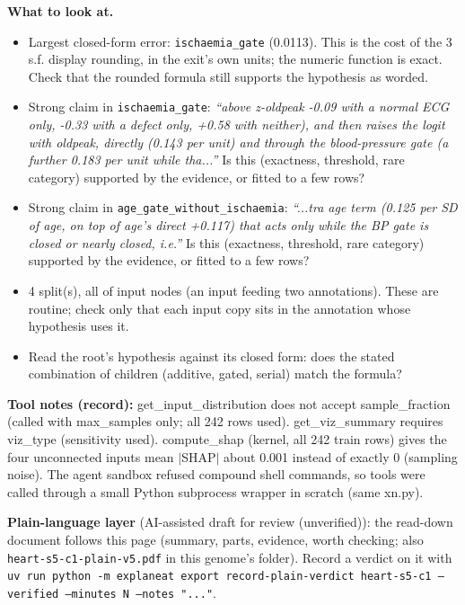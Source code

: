 \documentclass[a4paper,11pt]{article}
\begin{document}
\textbf{What to look at.}
\begin{itemize}
\item Largest closed-form error: \texttt{ischaemia\_\allowbreak{}gate} (0.0113). This is the cost of the 3 s.f. display rounding, in the exit's own units; the numeric function is exact. Check that the rounded formula still supports the hypothesis as worded.
\item Strong claim in \texttt{ischaemia\_\allowbreak{}gate}: \emph{``above z-oldpeak -0.09 with a normal ECG only, -0.33 with a defect only, +0.58 with neither), and then raises the logit with oldpeak, directly (0.143 per unit) and through the blood-pressure gate (a further 0.183 per unit while tha...''} Is this (exactness, threshold, rare category) supported by the evidence, or fitted to a few rows?
\item Strong claim in \texttt{age\_\allowbreak{}gate\_\allowbreak{}without\_\allowbreak{}ischaemia}: \emph{``...tra age term (0.125 per SD of age, on top of age's direct +0.117) that acts only while the BP gate is closed or nearly closed, i.e.''} Is this (exactness, threshold, rare category) supported by the evidence, or fitted to a few rows?
\item 4 split(s), all of input nodes (an input feeding two annotations). These are routine; check only that each input copy sits in the annotation whose hypothesis uses it.
\item Read the root's hypothesis against its closed form: does the stated combination of children (additive, gated, serial) match the formula?
\end{itemize}
\textbf{Tool notes (record):} get\_\allowbreak{}input\_\allowbreak{}distribution does not accept sample\_\allowbreak{}fraction (called with max\_\allowbreak{}samples only; all 242 rows used). get\_\allowbreak{}viz\_\allowbreak{}summary requires viz\_\allowbreak{}type (sensitivity used). compute\_\allowbreak{}shap (kernel, all 242 train rows) gives the four unconnected inputs mean $|$SHAP$|$ about 0.001 instead of exactly 0 (sampling noise). The agent sandbox refused compound shell commands, so tools were called through a small Python subprocess wrapper in scratch (same xn.py).

\textbf{Plain-language layer} (AI-assisted draft for review (unverified)): the read-down document follows this page (summary, parts, evidence, worth checking; also \texttt{heart-s5-c1-plain-v5.pdf} in this genome's folder). Record a verdict on it with \texttt{uv run python -m explaneat export record-plain-verdict heart-s5-c1 --verified --minutes N --notes "..."}.
\end{document}
